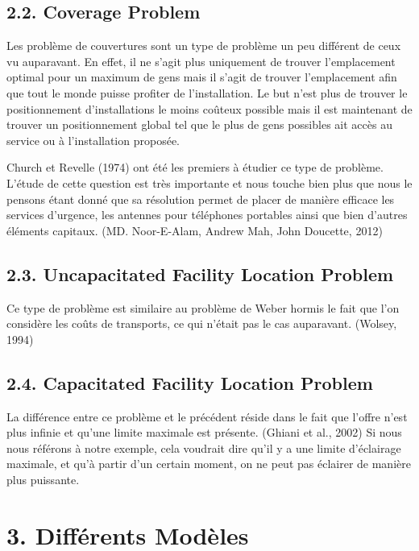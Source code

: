 \section*{2.2. Coverage Problem}

\bigskip

Les problème de couvertures sont un type de problème un peu différent de ceux vu auparavant. En effet, il ne s'agit plus uniquement de trouver l'emplacement optimal pour un maximum de gens mais il s'agit de trouver l'emplacement afin que tout le monde puisse profiter de l'installation. Le but n'est plus de trouver le positionnement d'installations le moins coûteux possible mais il est maintenant de trouver un positionnement global tel que le plus de gens possibles ait accès au service ou à l'installation proposée.

\bigskip

Church et Revelle (1974) ont été les premiers à étudier ce type de problème. L'étude de cette question est très importante et nous touche bien plus que nous le pensons étant donné que sa résolution permet de placer de manière efficace les services d'urgence, les antennes pour téléphones portables ainsi que bien d'autres éléments capitaux. (MD. Noor-E-Alam, Andrew Mah, John Doucette, 2012)

\section*{2.3. Uncapacitated Facility Location Problem}

\bigskip

Ce type de problème est similaire au problème de Weber hormis le fait que l'on considère les coûts de transports, ce qui n'était pas le cas auparavant. (Wolsey, 1994) 

\section*{2.4. Capacitated Facility Location Problem}

\bigskip

La différence entre ce problème et le précédent réside dans le fait que l'offre n'est plus infinie et qu'une limite maximale est présente. (Ghiani et al., 2002) Si nous nous référons à notre exemple, cela voudrait dire qu'il y a une limite d'éclairage maximale, et qu'à partir d'un certain moment, on ne peut pas éclairer de manière plus puissante.

\clearpage

\chapter*{3. Différents Modèles}

